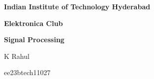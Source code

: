 \begin{titlepage}
\centering
{\bfseries\Huge Indian Institute of Technology Hyderabad\par}


\vfill
\noindent
{\bfseries\Huge Elektronica Club  \par}
\bigskip%
\vspace{0.5cm}

{\bfseries\Large Signal Processing\par}
\vspace{0.5cm}
\noindent
\vfill
{\Large K Rahul\par}
{\Large ee23btech11027 \par}
\vfill
\end{titlepage}
\setcounter{page}{0}